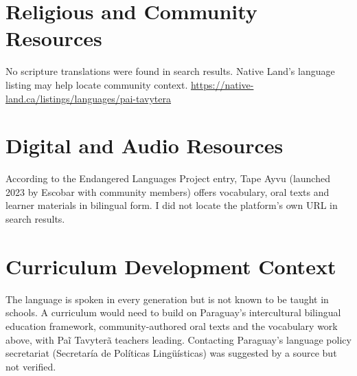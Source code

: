 \documentclass[12pt]{article}
\begin{document}
\section{Religious and Community Resources}
No scripture translations were found in search results. Native Land's language listing may help locate community context. \url{https://native-land.ca/listings/languages/pai-tavytera}

\section{Digital and Audio Resources}
According to the Endangered Languages Project entry, Tape Ayvu (launched 2023 by Escobar with community members) offers vocabulary, oral texts and learner materials in bilingual form. I did not locate the platform's own URL in search results.

\section{Curriculum Development Context}
The language is spoken in every generation but is not known to be taught in schools. A curriculum would need to build on Paraguay's intercultural bilingual education framework, community-authored oral texts and the vocabulary work above, with Pa\~i Tavyter\~a teachers leading. Contacting Paraguay's language policy secretariat (Secretar\'ia de Pol\'iticas Ling\"u\'isticas) was suggested by a source but not verified.
\end{document}
